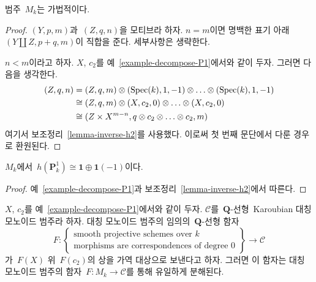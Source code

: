 \begin{lemma}
\label{lemma-additive}
범주\  $M_k$는 가법적이다.
\end{lemma}

\begin{proof}
$(Y, p, m)$과\  $(Z, q, n)$을 모티브라 하자. $n = m$이면 명백한
표기 아래\  $(Y \amalg Z, p + q, m)$이 직합을 준다. 세부사항은 생략한다.

\medskip\noindent
$n < m$이라고 하자. $X$, $c_2$를 예\ 
\ref{example-decompose-P1}에서와 같이 두자. 그러면 다음을 생각한다.
\begin{align*}
(Z, q, n)
& =
(Z, q, m) \otimes (\mathop{\mathrm{Spec}}(k), 1, -1) \otimes \ldots \otimes
(\mathop{\mathrm{Spec}}(k), 1, -1) \\
& \cong
(Z, q, m) \otimes (X, c_2, 0) \otimes \ldots \otimes (X, c_2, 0) \\
& \cong
(Z \times X^{m - n}, q \otimes c_2 \otimes \ldots \otimes c_2, m)
\end{align*}
여기서 보조정리\  \ref{lemma-inverse-h2}를 사용했다.
이로써 첫 번째 문단에서 다룬 경우로 환원된다.
\end{proof}

\begin{lemma}
\label{lemma-decompose-P1}
$M_k$에서\  $h(\mathbf{P}^1_k) \cong \mathbf{1} \oplus \mathbf{1}(-1)$이다.
\end{lemma}

\begin{proof}
예\  \ref{example-decompose-P1}과 보조정리\  \ref{lemma-inverse-h2}에서 따른다.
\end{proof}

\begin{lemma}
\label{lemma-characterize-motives}
$X$, $c_2$를 예\  \ref{example-decompose-P1}에서와 같이 두자.
$\mathcal{C}$를\  $\mathbf{Q}$-선형\  Karoubian 대칭 모노이드 범주라 하자.
대칭 모노이드 범주의 임의의\  $\mathbf{Q}$-선형 함자
$$
F :
\left\{
\begin{matrix}
\text{smooth projective schemes over }k\\
\text{morphisms are correspondences of degree }0
\end{matrix}
\right\}
\longrightarrow
\mathcal{C}
$$
가\  $F(X)$ 위\  $F(c_2)$의 상을 가역 대상으로 보낸다고 하자.
그러면 이 함자는 대칭 모노이드 범주의 함자\ 
$F : M_k \to \mathcal{C}$를 통해 유일하게 분해된다.
\end{lemma}

